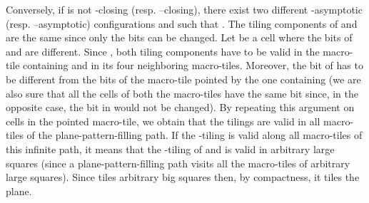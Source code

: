 \documentclass{llncs}
\begin{document}
Conversely, if  is not -closing (resp. --closing), there exist two different -asymptotic (resp. --asymptotic)
configurations
 and 
such that . The tiling components
of  and  are the same since only the bits can be changed.
Let  be a cell where the bits of  and  are different.
Since , both tiling components have to be valid in the
macro-tile containing  and in its four neighboring macro-tiles. Moreover, 
the bit of  has to be different from the bits of the macro-tile pointed by the
one containing  (we are also sure that all the cells of both the macro-tiles
have the same bit since, in the opposite case, the bit in  would not be changed). By repeating this argument on cells in the pointed macro-tile, we obtain that the tilings are valid in all macro-tiles of the plane-pattern-filling path.
 If the
-tiling is valid along all macro-tiles of this infinite path, it means
that the -tiling of  and  is valid in arbitrary large squares (since a plane-pattern-filling
path visits all the macro-tiles of arbitrary large squares). 
Since  tiles arbitrary big squares then, by compactness, it
tiles the plane. 
\end{document}
